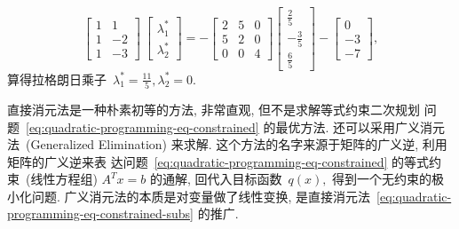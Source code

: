 \begin{exam}
\begin{equation*}
\begin{bmatrix} 1 & 1 \\ 1 & -2 \\ 1 & -3 \end{bmatrix} ~ \begin{bmatrix} \lambda_1^* \\ \lambda_2^* \end{bmatrix} = - \begin{bmatrix} 2 & 5 & 0 \\ 5 & 2 & 0 \\ 0 & 0 & 4 \end{bmatrix} \begin{bmatrix} \frac{2}{5} \\ -\frac{3}{5} \\ \frac{6}{5} \end{bmatrix} - \begin{bmatrix} 0 \\ -3 \\ -7 \end{bmatrix},
\end{equation*}
算得拉格朗日乘子~$\lambda_1^* = \frac{11}{5}, \lambda_2^* = 0.$
\end{exam}

直接消元法是一种朴素初等的方法, 非常直观, 但不是求解等式约束二次规划
问题~\eqref{eq:quadratic-programming-eq-constrained} 的最优方法. 还可以采用广义消元法~(Generalized Elimination) 来求解. 这个方法的名字来源于矩阵的广义逆, 利用矩阵的广义逆来表
达问题~\eqref{eq:quadratic-programming-eq-constrained} 的等式约束~(线性方程组) $A^T {x} = {b}$ 的通解, 回代入目标函数~$q({x}),$ 得到一个无约束的极小化问题. 广义消元法的本质是对变量做了线性变换, 是直接消元法~\eqref{eq:quadratic-programming-eq-constrained-subs} 的推广.


